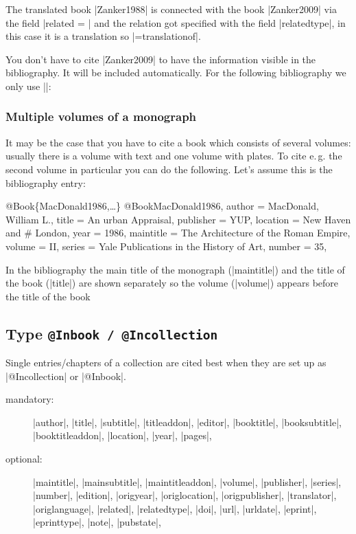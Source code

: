 \documentclass[a4paper,
10pt,
greek,
french,
spanish,
italian,
ngerman,
english
]{ltxdoc}
\begin{document}
The translated book |Zanker1988| is connected with the book |Zanker2009| via the field |related = | 
and the relation got specified with the field |relatedtype|, in this case it is a translation so |={translationof}|.

You don't have to cite |Zanker2009| to have the information visible in the bibliography. 
It will be included automatically. For the following bibliography we only use |\cite{Zanker1988}|:



\subsubsection{Multiple volumes of a monograph}
It may be the case that you have to cite a book which consists of several volumes:
usually there is a volume with text and one volume with plates.
To cite  e.\,g. the second volume in particular you can do the following.
Let’s assume this is the bibliography entry:
\begin{bibexample}[label=MacDonald1986]{{@}Book\{MacDonald1986,…\}}
@Book{MacDonald1986,
  author    = {MacDonald, William L.},
  title     = {An urban Appraisal},
  publisher = YUP,    %
  location  = {New Haven and }# London, %
  year      = {1986},
  maintitle = {The Architecture of the Roman Empire},
  volume    = {II},
  series    = {Yale Publications in the History of Art},
  number    = {35},
}
\end{bibexample}
In the bibliography the main title of the monograph (|maintitle|)
and the title of the book (|title|) are shown separately  so the volume  (|volume|) 
appears before the title of the book


\subsection{Type \texttt{@Inbook / @Incollection}}\label{inbook}
Single entries/chapters of a collection are cited best when they are set up as  |@Incollection| or |@Inbook|.

\begin{description}
\item[mandatory:] 
|author|, |title|, |subtitle|, |titleaddon|,
|editor|,  |booktitle|, |booksubtitle|, |booktitleaddon|,
|location|, |year|, |pages|, 
\item[optional:]
|maintitle|, |mainsubtitle|, |maintitleaddon|, |volume|, 
|publisher|, |series|, |number|, |edition|, 
|origyear|, |origlocation|, |origpublisher|, 
|translator|, |origlanguage|,
|related|, |relatedtype|,
|doi|, |url|, |urldate|, |eprint|, |eprinttype|, |note|, |pubstate|, 
 \end{description}
 
\end{document}
